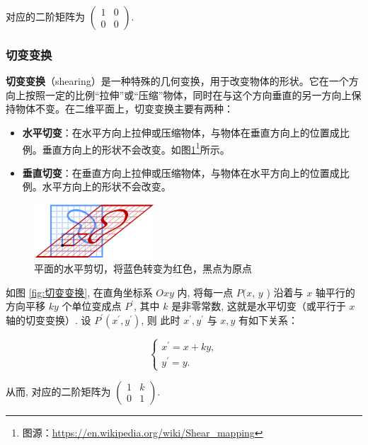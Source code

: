 \documentclass[lang=cn,newtx,10pt,scheme=chinese]{elegantbook}
\begin{document}
对应的二阶矩阵为 $\left(\begin{array}{ll}1 & 0 \\ 0 & 0\end{array}\right)$.

\subsubsection{切变变换}
\label{subsubsec:切变变换}

\textcolor{third}{\bf 切变变换}（shearing）是一种特殊的几何变换，用于改变物体的形状。它在一个方向上按照一定的比例“拉伸”或“压缩”物体，同时在与这个方向垂直的另一方向上保持物体不变。在二维平面上，切变变换主要有两种：

\begin{itemize}
    \item \textbf{水平切变}：在水平方向上拉伸或压缩物体，与物体在垂直方向上的位置成比例。垂直方向上的形状不会改变。如图\ref{fig:shearing-wiki}\footnote{图源：\url{https://en.wikipedia.org/wiki/Shear\_mapping}}所示。
    \item \textbf{垂直切变}：在垂直方向上拉伸或压缩物体，与物体在水平方向上的位置成比例。水平方向上的形状不会改变。
\end{itemize}


\begin{figure}[!h]
    \centering
    \includegraphics[width=0.4\textwidth]{figure/matrix/shearing.png}
    \caption{平面的水平剪切，将蓝色转变为红色，黑点为原点}
    \label{fig:shearing-wiki}
\end{figure}


如图 \ref{fig:切变变换}, 在直角坐标系 $O x y$ 内, 将每一点 $P(x$, $y$ ) 沿着与 $x$ 轴平行的方向平移 $k y$ 个单位变成点 $P^{\prime}$, 其中 $k$ 是非零常数, 这就是水平切变（或平行于 $x$ 轴的切变变换）.
设 $P^{\prime}\left(x^{\prime}, y^{\prime}\right)$, 则
此时 $x^{\prime}, y^{\prime}$ 与 $x, y$ 有如下关系：

$$
\left\{\begin{array}{c}
x^{\prime}=x+k y, \\
y^{\prime}=y .
\end{array}\right.
$$

从而, 对应的二阶矩阵为 $\left(\begin{array}{ll}1 & k \\ 0 & 1\end{array}\right)$.
\end{document}
